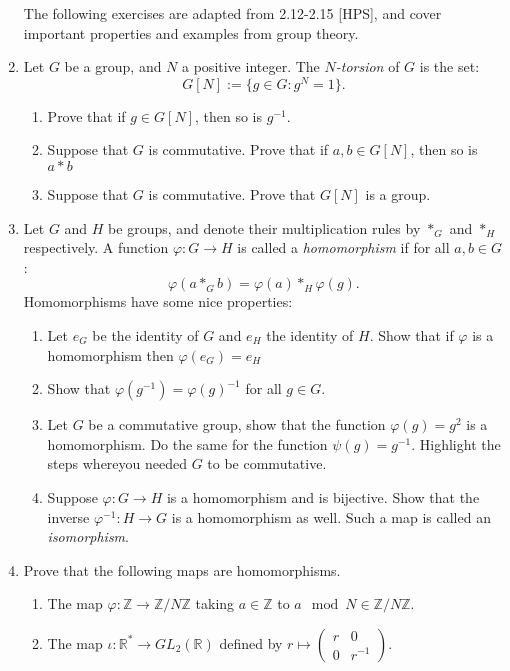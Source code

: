 \documentclass[11pt]{article}
\newcommand{\bR}{\mathbb{R}}
\newcommand{\bZ}{\mathbb{Z}}
\begin{document}
\begin{enumerate}
  The following exercises are adapted from 2.12-2.15 [HPS], and cover important properties and examples from group theory.
  \item{
  Let $G$ be a group, and $N$ a positive integer.  The \textit{$N$-torsion} of $G$ is the set:
  \[G[N]:=\{g\in G:g^N = 1\}.\]
  \begin{enumerate}
    \item{
    Prove that if $g\in G[N]$, then so is $g^{-1}$.
    }
    \item{
    Suppose that $G$ is commutative.  Prove that if $a,b\in G[N]$, then so is $a*b$
    }
    \item{
    Suppose that $G$ is commutative.  Prove that $G[N]$ is a group.
    }
  \end{enumerate}
  }
  \item{
  Let $G$ and $H$ be groups, and denote their multiplication rules by $*_G$ and $*_H$ respectively.  A function $\varphi:G\to H$ is called a \textit{homomorphism} if for all $a,b\in G$:
  \[\varphi(a*_G b) = \varphi(a)*_H\varphi(g).\]
  Homomorphisms have some nice properties:
  \begin{enumerate}
    \item{
    Let $e_G$ be the identity of $G$ and $e_H$ the identity of $H$.  Show that if $\varphi$ is a homomorphism then $\varphi(e_G) = e_H$
    }
    \item{
    Show that $\varphi(g^{-1})=\varphi(g)^{-1}$ for all $g\in G$.
    }
    \item{
    Let $G$ be a commutative group, show that the function $\varphi(g) = g^2$ is a homomorphism.  Do the same for the function $\psi(g) = g^{-1}$.  Highlight the steps whereyou needed $G$ to be commutative.
    }
    \item{
    Suppose $\varphi:G\to H$ is a homomorphism and is bijective.  Show that the inverse $\varphi^{-1}:H\to G$ is a homomorphism as well.  Such a map is called an \textit{isomorphism}.
    }
  \end{enumerate}
  }
  \item{
  Prove that the following maps are homomorphisms.
  \begin{enumerate}
    \item{
    The map $\varphi:\bZ\to\bZ/N\bZ$ taking $a\in\bZ$ to $a\mod N\in\bZ/N\bZ$.
    }
    \item{
    The map $\iota:\bR^*\to GL_2(\bR)$ defined by $r\mapsto\begin{pmatrix}r&0\\0&r^{-1}\end{pmatrix}$.
}
\end{enumerate}}
\end{enumerate}
\end{document}
